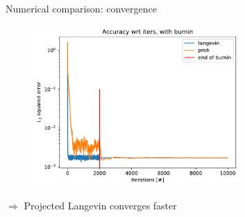 \documentclass{beamer}
\begin{document}
\begin{frame}{Numerical comparison: convergence}
    
\begin{figure}[H]
        \centering
        \includegraphics[width=0.7\textwidth]{figures/experiments/baseline/iters_acc_comp_iters_no_avg-1.png}
    
    \end{figure}
    $\Longrightarrow$ Projected Langevin converges faster
\end{frame}
\end{document}
